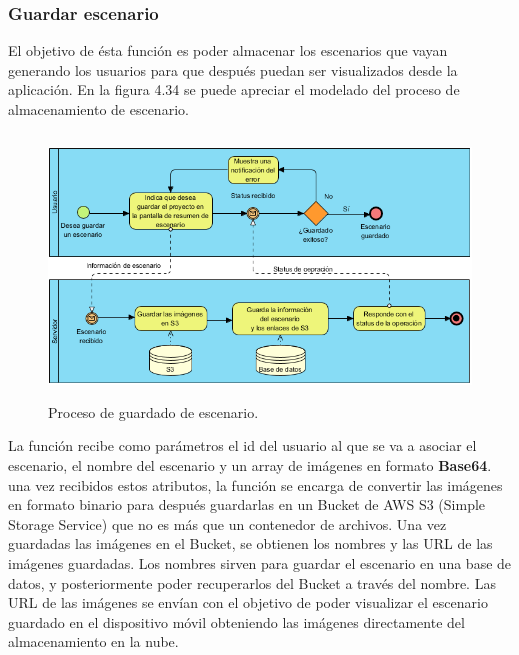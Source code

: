 \subsubsection{Guardar escenario}
El objetivo de ésta función es poder almacenar los escenarios que vayan generando los usuarios para que después puedan ser visualizados desde la aplicación. En la figura 4.34 se puede apreciar el modelado del proceso de almacenamiento de escenario. \par
\begin{figure}[h!]
	\centering
	\includegraphics[width=13cm,height=7cm]{imagenes/desarrollo/diagramas/BPMN_STORESC.png}
	\caption{Proceso de guardado de escenario.}
	\label{fig:regsuccess}
\end{figure}

La función recibe como parámetros el id del usuario al que se va a asociar el escenario, el nombre del escenario y un array de imágenes en formato \textbf{Base64}. una vez recibidos estos atributos, la función se encarga de convertir las imágenes en formato binario para después guardarlas en un Bucket de AWS S3 (Simple Storage Service) que no es más que un contenedor de archivos. Una vez guardadas las imágenes en el Bucket, se obtienen los nombres y las URL de las imágenes guardadas. Los nombres sirven para guardar el escenario en una base de datos, y posteriormente poder recuperarlos del Bucket a través del nombre. Las URL de las imágenes se envían con el objetivo de poder visualizar el escenario guardado en el dispositivo móvil obteniendo las imágenes directamente del almacenamiento en la nube.
